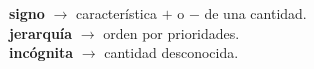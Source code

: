 \begin{defcard}
    \textbf{signo} $\rightarrow$  característica $+$ o $-$ de una cantidad. \\
    \textbf{jerarquía}	$\rightarrow$ orden por prioridades.\\
    \textbf{incógnita}	$\rightarrow$ cantidad desconocida.\\
\end{defcard}